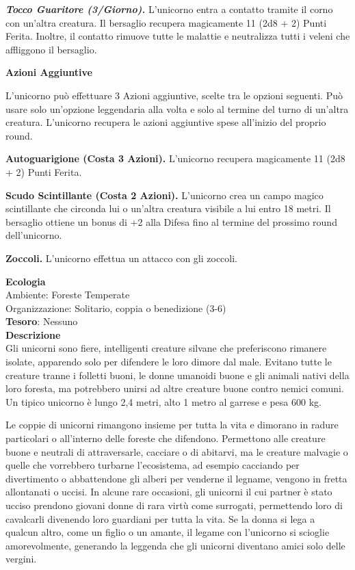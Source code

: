 \begin{multicols}{2}
	\textit{\textbf{Tocco Guaritore (3/Giorno).}} L'unicorno entra a contatto tramite il corno con un'altra creatura. Il bersaglio recupera magicamente 11 (2d8 + 2) Punti Ferita. Inoltre, il contatto rimuove tutte le malattie e neutralizza tutti i veleni che affliggono il bersaglio.

	\textbf{Azioni Aggiuntive}

	L'unicorno può effettuare 3 Azioni aggiuntive, scelte tra le opzioni seguenti. Può usare solo un'opzione leggendaria alla volta e solo al termine del turno di un'altra creatura. L'unicorno recupera le azioni aggiuntive spese all'inizio del proprio round.

	\textbf{Autoguarigione (Costa 3 Azioni).} L'unicorno recupera magicamente 11 (2d8 + 2) Punti Ferita.

	\textbf{Scudo Scintillante (Costa 2 Azioni).} L'unicorno crea un campo magico scintillante che circonda lui o un'altra creatura visibile a lui entro 18 metri. Il bersaglio ottiene un bonus di +2 alla Difesa fino al termine del prossimo round dell'unicorno.

	\textbf{Zoccoli.} L'unicorno effettua un attacco con gli zoccoli.

	\textbf{Ecologia}\\
	Ambiente: Foreste Temperate\\
	Organizzazione: Solitario, coppia o benedizione (3-6)\\
	\textbf{Tesoro}: Nessuno\\
	\textbf{Descrizione}\\
	Gli unicorni sono fiere, intelligenti creature silvane che preferiscono rimanere isolate, apparendo solo per difendere le loro dimore dal male. Evitano tutte le creature tranne i folletti buoni, le donne umanoidi buone e gli animali nativi della loro foresta, ma potrebbero unirsi ad altre creature buone contro nemici comuni. Un tipico unicorno è lungo 2,4 metri, alto 1 metro al garrese e pesa 600 kg.

	Le coppie di unicorni rimangono insieme per tutta la vita e dimorano in radure particolari o all'interno delle foreste che difendono. Permettono alle creature buone e neutrali di attraversarle, cacciare o di abitarvi, ma le creature malvagie o quelle che vorrebbero turbarne l'ecosistema, ad esempio cacciando per divertimento o abbattendone gli alberi per venderne il legname, vengono in fretta allontanati o uccisi. In alcune rare occasioni, gli unicorni il cui partner è stato ucciso prendono giovani donne di rara virtù come surrogati, permettendo loro di cavalcarli divenendo loro guardiani per tutta la vita. Se la donna si lega a qualcun altro, come un figlio o un amante, il legame con l'unicorno si scioglie amorevolmente, generando la leggenda che gli unicorni diventano amici solo delle vergini.


\end{multicols}
